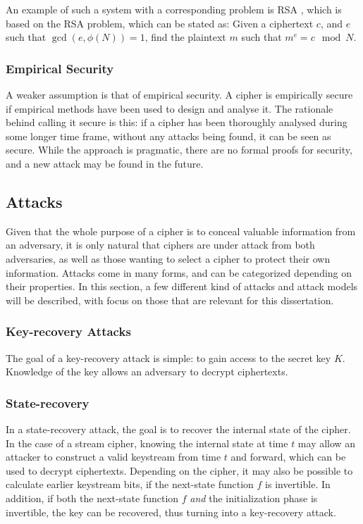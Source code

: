An example of such a system with a corresponding problem is RSA \cite{rivest:1978}, which is based on the RSA problem, which can be stated as: Given a ciphertext $c$, and $e$ such that $\gcd(e, \phi(N)) = 1$, find the plaintext $m$ such that $m^e = c \mod N$.

\subsubsection{Empirical Security}
A weaker assumption is that of empirical security.
A cipher is empirically secure if empirical methods have been used to design and analyse it.
The rationale behind calling it secure is this: if a cipher has been thoroughly analysed during some longer time frame, without any attacks being found, it can be seen as secure.
While the approach is pragmatic, there are no formal proofs for security, and a new attack may be found in the future.

\subsection{Attacks}

Given that the whole purpose of a cipher is to conceal valuable information from an adversary, it is only natural that ciphers are under attack from both adversaries, as well as those wanting to select a cipher to protect their own information.
Attacks come in many forms, and can be categorized depending on their properties.
In this section, a few different kind of attacks and attack models will be described, with focus on those that are relevant for this dissertation.

\subsubsection{Key-recovery Attacks}

The goal of a key-recovery attack is simple: to gain access to the secret key $K$.
Knowledge of the key allows an adversary to decrypt ciphertexts.

\subsubsection{State-recovery}

In a state-recovery attack, the goal is to recover the internal state of the cipher.
In the case of a stream cipher, knowing the internal state at time $t$ may allow an attacker to construct a valid keystream from time $t$ and forward, which can be used to decrypt ciphertexts.
Depending on the cipher, it may also be possible to calculate earlier keystream bits, if the next-state function $f$ is invertible.
In addition, if both the next-state function $f$ \emph{and} the initialization phase is invertible, the key can be recovered, thus turning into a key-recovery attack.

